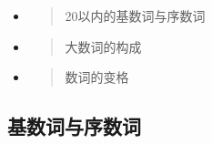 \begin{itemize}
\item
  \begin{quote}
  20以内的基数词与序数词
  \end{quote}
\item
  \begin{quote}
  大数词的构成
  \end{quote}
\item
  \begin{quote}
  数词的变格
  \end{quote}
\end{itemize}

\subsection{\texorpdfstring{\textbf{基数词与序数词}}{基数词与序数词}}\label{\texorpdfstring{\textbf{基数词与序数词}

下面是古诺尔斯语中基本的数词：

}}
